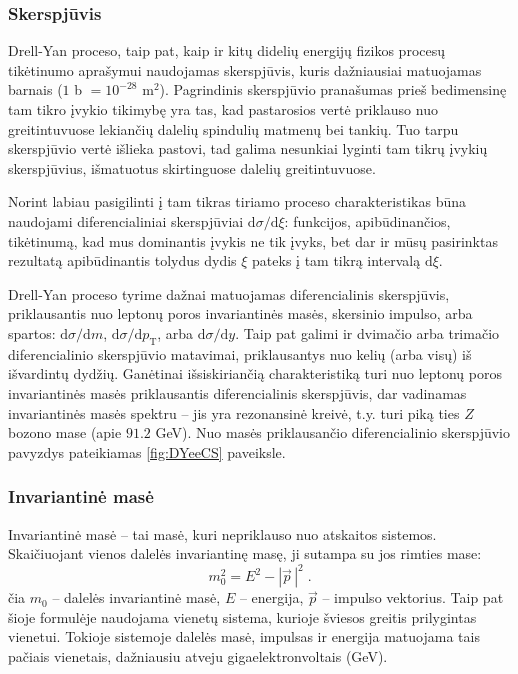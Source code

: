 \documentclass[a4paper, 12pt]{article}
\newlength\q
\begin{document}
\subsubsection{Skerspjūvis}

Drell-Yan proceso, taip pat, kaip ir kitų didelių energijų fizikos procesų tikėtinumo aprašymui
naudojamas skerspjūvis, kuris dažniausiai matuojamas barnais ($1$ b $= 10^{-28}$ m$^{2}$).
Pagrindinis skerspjūvio pranašumas prieš bedimensinę tam tikro įvykio tikimybę yra tas, kad
pastarosios vertė priklauso nuo greitintuvuose lekiančių dalelių spindulių matmenų bei tankių.
Tuo tarpu skerspjūvio vertė išlieka pastovi, tad galima nesunkiai lyginti tam tikrų įvykių
skerspjūvius, išmatuotus skirtinguose dalelių greitintuvuose.

Norint labiau pasigilinti į tam tikras tiriamo proceso charakteristikas būna naudojami diferencialiniai
skerspjūviai $\mathrm{d}\sigma/\mathrm{d}\xi$: funkcijos, apibūdinančios, tikėtinumą, kad mus
dominantis įvykis ne tik įvyks, bet dar ir mūsų pasirinktas rezultatą apibūdinantis tolydus
dydis $\xi$ pateks į tam tikrą intervalą $\mathrm{d}\xi$.

Drell-Yan proceso tyrime dažnai matuojamas diferencialinis skerspjūvis, priklausantis nuo
leptonų poros invariantinės masės, skersinio impulso, arba spartos:
$\mathrm{d}\sigma / \mathrm{d}m$, $\mathrm{d}\sigma / \mathrm{d}p_{\mathrm{T}}$, arba
$\mathrm{d}\sigma / \mathrm{d}y$.
Taip pat galimi ir dvimačio arba trimačio diferencialinio skerspjūvio matavimai,
priklausantys nuo kelių (arba visų) iš išvardintų dydžių.
Ganėtinai išsiskiriančią charakteristiką turi nuo leptonų poros invariantinės masės priklausantis
diferencialinis skerspjūvis, dar vadinamas invariantinės masės spektru -- jis yra rezonansinė
kreivė, t.y. turi piką ties $Z$ bozono mase (apie $91.2$ GeV).
Nuo masės priklausančio diferencialinio skerspjūvio pavyzdys pateikiamas \ref{fig:DYeeCS} paveiksle.

\subsubsection*{Invariantinė masė} 

Invariantinė masė -- tai masė, kuri nepriklauso nuo atskaitos sistemos.
Skaičiuojant vienos dalelės invariantinę masę, ji sutampa su jos rimties mase:
\begin{equation}
	m_{0}^{2} = E^{2} - | \vec{p}\, |^{2} \; .
	\label{eq:invm}
\end{equation}
čia $m_{0}$ -- dalelės invariantinė masė, $E$ -- energija, $\vec{p}$ -- impulso vektorius.
Taip pat šioje formulėje naudojama vienetų sistema, kurioje šviesos greitis prilygintas vienetui.
Tokioje sistemoje dalelės masė, impulsas ir energija matuojama tais pačiais vienetais, dažniausiu atveju
gigaelektronvoltais (GeV).
\end{document}
